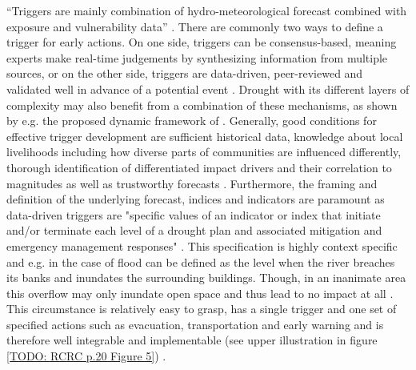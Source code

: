 “Triggers are mainly combination of hydro-meteorological forecast combined with exposure and vulnerability data” \autocite[19]{rcrcFORECASTBASEDFINANCINGEARLY2020}. There are commonly two ways to define a trigger for early actions. On one side, triggers can be consensus-based, meaning experts make real-time judgements by synthesizing information from multiple sources, or on the other side, triggers are data-driven, peer-reviewed and validated well in advance of a potential event \autocite{rcrcFORECASTBASEDFINANCINGEARLY2020}. Drought with its different layers of complexity may also benefit from a combination of these mechanisms, as shown by e.g. the proposed dynamic framework of \autocite{boultDroughtImpactbasedForecasting2022}. Generally, good conditions for effective trigger development are sufficient historical data, knowledge about local livelihoods including how diverse parts of communities are influenced differently, thorough identification of differentiated impact drivers and their correlation to magnitudes as well as trustworthy forecasts \autocite{coughlandeperezForecastbasedFinancingApproach2015,coughlandeperezActionbasedFloodForecasting2016,elisabethstephensFORECASTBASEDACTION2015,harrowsmithFutureForecastImpact2020,rcrcFORECASTBASEDFINANCINGEARLY2020}.\newline
Furthermore, the framing and definition of the underlying forecast, indices and indicators are paramount as data-driven triggers are "specific values of an indicator or index that initiate and/or terminate each level of a drought plan and associated mitigation and emergency management responses" \autocites{rcrcFORECASTBASEDFINANCINGEARLY2020}[13]{svobodaHandbookDroughtIndicators2016}. This specification is highly context specific and e.g. in the case of flood can be defined as the level when the river breaches its banks and inundates the surrounding buildings. Though, in an inanimate area this overflow may only inundate open space and thus lead to no impact at all \autocite{elisabethstephensFORECASTBASEDACTION2015}. This circumstance is relatively easy to grasp, has a single trigger and one set of specified actions such as evacuation, transportation and early warning and is therefore well integrable and implementable (see upper illustration in figure \ref{TODO: RCRC p.20 Figure 5}) \autocite{siahaanForecastbasedActionDREF2018}. 


